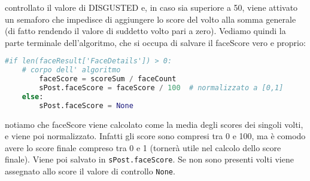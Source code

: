 controllato il valore di DISGUSTED e, in caso sia superiore a 50, viene attivato un semaforo 
che impedisce di aggiungere lo score del volto alla somma generale (di fatto rendendo il valore
di suddetto volto pari a zero).
Vediamo quindi la parte terminale dell'algoritmo, che si occupa di salvare il faceScore vero e proprio:
\begin{lstlisting}[language=Python]
    #if len(faceResult['FaceDetails']) > 0: 
    # corpo dell' algoritmo 
        faceScore = scoreSum / faceCount 
        sPost.faceScore = faceScore / 100  # normalizzato a [0,1]
    else:
        sPost.faceScore = None
\end{lstlisting}
notiamo che faceScore viene calcolato come la media degli scores dei singoli volti, e viene poi
normalizzato. Infatti gli score sono compresi tra 0 e 100, ma è comodo avere lo score finale compreso
tra 0 e 1 (tornerà utile nel calcolo dello score finale). 
Viene poi salvato in \verb+sPost.faceScore+. 
Se non sono presenti volti viene assegnato allo score il valore di controllo \verb+None+.
